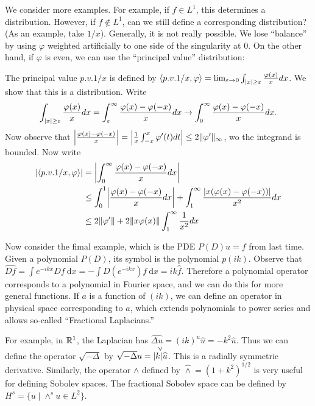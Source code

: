 \documentclass[10pt, twoside]{article}
\renewcommand{\d}{\ \mathrm{d}}
\begin{document}
    We consider more examples. For example, if $f \in L^1$, this determines a
    distribution. However, if $f \notin L^1$, can we still define a
    corresponding distribution? (As an example, take $1/x$). Generally, it is
    not really possible. We lose ``balance'' by using $\varphi$ weighted
    artificially to one side of the singularity at $0$. On the other hand, if
    $\varphi$ is even, we can use the ``principal value'' distribution:

    The principal value $p.v.1/x$ is defined by $\gen{p.v.1/x, \varphi} =
    \lim_{\ep \to 0} \int_{\abs{x} \geq \ep} \frac{\varphi(x)}{x} dx$. We show
    that this is a distribution. Write \begin{align*} \int_{\abs{x} \geq \ep}
        \frac{\varphi(x)}{x} dx = \int_{\ep}^{\infty} \frac{\varphi(x) -
        \varphi(-x)}{x} dx \to \int_0^{\infty} \frac{\varphi(x) -
    \varphi(-x)}{x} dx.  \end{align*} Now observe that $\abs*{\frac{\varphi(x)
- \varphi(-x)}{x}} = \abs*{\frac{1}{x} \int_{-x}^x \varphi'(t) dt} \leq 2
\norm{\varphi'}_{\infty}$, wo the integrand is bounded. Now write
\begin{align*} \abs{\gen{p.v.1/x,\varphi}} &=
    \abs*{\int_0^{\infty}\frac{\varphi(x) - \varphi(-x)}{x} dx} \\ &\leq
    \int_0^1 \abs*{\frac{\varphi(x) - \varphi(-x)}{x} dx} + \int_1^{\infty}
    \frac{\abs{x(\varphi(x) - \varphi(-x))}}{x^2} dx \\ &\leq 2 \norm{\varphi'}
    + 2 \norm{x \varphi(x)}\int_1^{\infty} \frac{1}{x^2} dx \end{align*}

    Now consider the fimal example, which is the PDE $P(D)u = f$ from last
    time. Given a polynomial $P(D)$, its symbol is the polynomial $p(ik)$.
    Observe that $\widehat{Df} = \int e^{-ikx} Df \d x = -\int D(e^{-ikx}) f \d
    x = ik\widehat{f}$. Therefore a polynomial operator corresponds to a
    polynomial in Fourier space, and we can do this for more general functions.
    If $a$ is a function of $(ik)$, we can define an operator in physical space
    corresponding to $a$, which extends polynomials to power series and allows
    so-called ``Fractional Laplacians.''

    For example, in $\R^1$, the Laplacian has $\widehat{\Delta u} = (ik)^u
    \widehat{u} = -k^2\widehat{u}$. Thus we can define the operator
    $\sqrt{-\Delta}$ by $\sqrt{-\Delta} u =
    \overset{\vee}{\abs{k}\widehat{u}}$. This is a radially symmetric
    derivative. Similarly, the operator $\land$ defined by $\widehat{\land} =
    (1+k^2)^{1/2}$ is very useful for defining Sobolev spaces. The fractional
    Sobolev space can be defined by $H^s = \{ u \mid \land^s u \in L^2 \}$.
    
\end{document}
